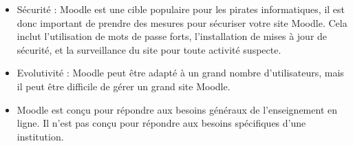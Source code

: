 \begin{enumerate}
\begin{itemize}
            \item Sécurité : Moodle est une cible populaire pour les pirates informatiques, il est donc important de prendre des mesures pour sécuriser votre site Moodle. Cela inclut l'utilisation de mots de passe forts, l'installation de mises à jour de sécurité, et la surveillance du site pour toute activité suspecte.
            \item Evolutivité : Moodle peut être adapté à un grand nombre d'utilisateurs, mais il peut être difficile de gérer un grand site Moodle.
            \item Moodle est conçu pour répondre aux besoins généraux de l'enseignement en ligne. Il n'est pas conçu pour répondre aux besoins spécifiques d'une institution.
        \end{itemize}
\end{enumerate}

